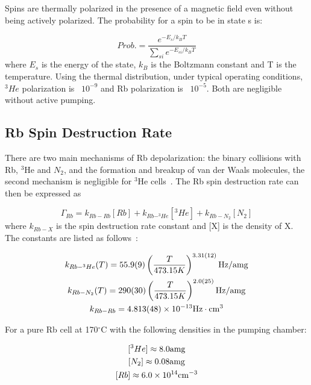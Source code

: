 Spins are thermally polarized in the presence of a magnetic field even without being actively polarized. The probability for a spin to be in state s is:

\begin{equation}
Prob. = \frac{e^{-E_{s}/k_{B}T}}{\sum_{si}e^{-E_{si}/k_{B}T}}
\end{equation}
where $E_{s}$ is the energy of the state, $k_{B}$ is the Boltzmann constant and T is the temperature. Using the thermal distribution, under typical operating conditions, $^{3}He$ polarization is ~$10^{-9}$ and Rb polarization is ~$10^{-5}$. Both are negligible without active pumping.

\subsection{Rb Spin Destruction Rate}

There are two main mechanisms of Rb depolarization: the binary collisions with Rb, $^{3}$He and $N_{2}$, and the formation and breakup of van der Waals molecules, the second mechanism is negligible for $^{3}$He cells~\cite{WalkerHapper}. The Rb spin destruction rate can then be expressed as

\begin{equation}
\Gamma_{Rb}=k_{Rb-Rb}[Rb]+k_{Rb-^{3}He}[^{3}He]+k_{Rb-N_{2}}[N_{2}]
\end{equation}
where $k_{Rb-X}$ is the spin destruction rate constant and [X] is the density of X. The constants are listed as follows~\cite{Wagshul1994, PhysRevLett.10.108}:

\begin{subequations}
	\begin{gather}
	k_{Rb-^{3}He}(T)=55.9(9)\left(\frac{T}{473.15K}\right)^{3.31(12)} {\rm Hz/amg}\\
	k_{Rb-N_{2}}(T)=290(30)\left(\frac{T}{473.15K}\right)^{2.0(25)}{\rm Hz/amg}\\
	k_{Rb-Rb}=4.813(48)\times 10^{-13} {\rm Hz\cdot cm^{3}}
	\end{gather}
\end{subequations}

For a pure Rb cell at 170$^{\circ}$C with the following densities in the pumping chamber:

\begin{subequations}
	\begin{gather}
	[^{3}He] \approx 8.0 {\rm amg}\\
	[N_{2}] \approx 0.08 {\rm amg}\\
	[Rb] \approx 6.0 \times 10^{14} {\rm cm^{-3}}
	\end{gather}
\end{subequations}

